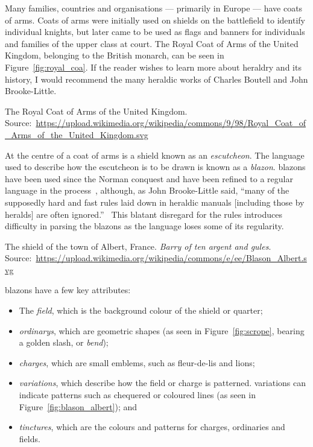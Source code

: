 \documentclass[nobib, a4paper, twoside, justified]{tufte-book}
\makeatletter
\newcommand{\charge}{\gls{charge}\@\xspace}
\newcommand{\charges}{\glspl{charge}\@\xspace}
\newcommand{\quarter}{\gls{quarter}\@\xspace}
\newcommand{\blazon}{\gls{blazon}\@\xspace}
\newcommand{\blazons}{\glspl{blazon}\@\xspace}
\newcommand{\ublazons}{\Glspl{blazon}\@\xspace}
\makeatother
\begin{document}
Many families, countries and organisations --- primarily in Europe --- have coats of arms. Coats of
arms were initially used on shields on the battlefield to identify individual knights, but later
came to be used as flags and banners for individuals and families of the upper class at court. The
Royal Coat of Arms of the United Kingdom, belonging to the British monarch, can be seen in
Figure~\ref{fig:royal_coa}. If the reader wishes to learn more about heraldry and its history, I
would recommend the many heraldic works of Charles Boutell and John Brooke-Little.

\begin{marginfigure}
  \centering
  \def\svgwidth{0.8\linewidth}
  
  \caption{The Royal Coat of Arms of the United Kingdom.
  Source:~\url{https://upload.wikimedia.org/wikipedia/commons/9/98/Royal_Coat_of_Arms_of_the_United_Kingdom.svg}}%
  \label{fig:royal_coa}
\end{marginfigure}

At the centre of a coat of arms is a shield known as an \textit{\gls{escutcheon}}. The language
used to describe how the escutcheon is to be drawn is known as a \textit{\blazon}.
\ublazons have been used since the Norman conquest and have been refined to a regular language
in the process~\autocite{boutell_1864}, although, as John Brooke-Little said, ``many of the
supposedly hard and fast rules laid down in heraldic manuals [including those by heralds] are often
ignored.''~\autocite{brooke_little_1985} This blatant disregard for the rules introduces
difficulty in parsing the \blazons as the language loses some of its regularity.

\begin{marginfigure}
  \centering
  \def\svgwidth{0.8\linewidth}
  
  \caption{The shield of the town of Albert, France. \textit{Barry of ten argent and
  gules}. Source:~\url{https://upload.wikimedia.org/wikipedia/commons/e/ee/Blason_Albert.svg}}%
  \label{fig:blason_albert}
\end{marginfigure}

\ublazons have a few key attributes:
\begin{itemize}
  \item The \textit{\gls{field}}, which is the background colour of the shield or
    \quarter;
  \item \textit{\Glspl{ordinary}}, which are geometric shapes (as seen in Figure~\ref{fig:scrope},
    bearing a golden slash, or \textit{bend});
  \item \textit{\Glspl{charge}}, which are small emblems, such as fleur-de-lis and lions;
  \item \textit{\Glspl{variation}}, which describe how the field or \charge is patterned.
    \Glspl{variation} can indicate patterns such as chequered or coloured lines (as seen in
    Figure~\ref{fig:blason_albert}); and
  \item \textit{\Glspl{tincture}}, which are the colours and patterns for \charges, ordinaries
    and fields.
\end{itemize}
\end{document}
